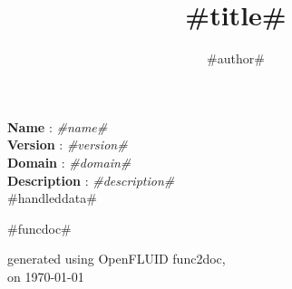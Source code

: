 \documentclass[a4paper,10pt]{article}
\title{#title#}
\author{#author#}
\date{}
\begin{document}
\maketitle

\noindent \textbf{Name} : \textit{#name#}\\
\noindent \textbf{Version} : \textit{#version#}\\
\noindent \textbf{Domain} : \textit{#domain#}\\
\noindent \textbf{Description} : \textit{#description#}\\

#handleddata#

\bigskip
\bigskip

\begin{multicols}{2}

#funcdoc#

\end{multicols}

\bigskip
\bigskip
\small
\begin{flushright}generated using OpenFLUID func2doc,\\
on \today\end{flushright}
\small
\end{document}
